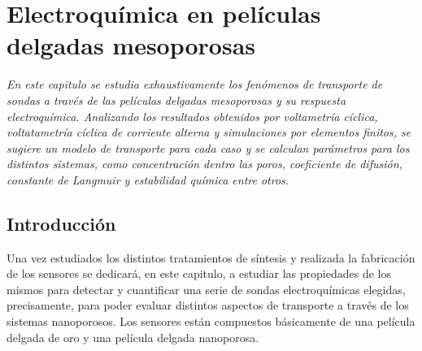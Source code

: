  \newcommand{\NoBiblioEQ}[1]{
 \ifthenelse{\equal{#1}{verdadero}}{}{}
 \NoBiblioEQ{verdadero}}


 \FormatoCapituloDosLineas
 
 \chapter{Electroquímica en películas delgadas mesoporosas}
 \label{chap:Electroquimica}

 \thispagestyle{empty}
	
 \noindent\textit{En este capitulo se estudia exhaustivamente los fenómenos de transporte de sondas a través de las películas delgadas mesoporosas y su respuesta electroquímica. Analizando los resultados obtenidos por voltametría cíclica, voltatametría cíclica de corriente alterna y simulaciones por elementos finitos, se sugiere un modelo de transporte para cada caso y se calculan parámetros para los distintos sistemas, como concentración dentro las poros, coeficiente de difusión, constante de Langmuir y estabilidad química entre otros.}

 \vfill
 \minitoc
 \newpage

\section{Introducción}

	Una vez estudiados los distintos tratamientos de síntesis y realizada la fabricación de los sensores se dedicará, en este capitulo, a estudiar las propiedades de los mismos para detectar y cuantificar una serie de sondas electroquímicas elegidas, precisamente, para poder evaluar distintos aspectos de transporte a través de los sistemas nanoporosos. 
	Los sensores están compuestos básicamente de una película delgada de oro y una película delgada nanoporosa.

